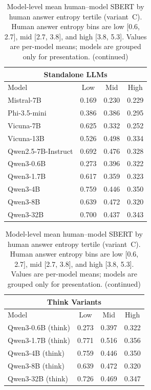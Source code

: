 \begin{table}[t]
\centering
\scriptsize
\caption{Model-level mean human--model SBERT by human answer entropy tertile (variant~C). Human answer entropy bins are low [0.6, 2.7], mid [2.7, 3.8], and high [3.8, 5.3]. Values are per-model means; models are grouped only for presentation. (continued)}
\begin{tabular}{lccc}
\toprule
\multicolumn{4}{c}{\textbf{Standalone LLMs}} \\
\midrule
Model & Low & Mid & High \\
\midrule
Mistral-7B & 0.169 & 0.230 & 0.229 \\
Phi-3.5-mini & 0.386 & 0.386 & 0.295 \\
Vicuna-7B & 0.625 & 0.332 & 0.252 \\
Vicuna-13B & 0.526 & 0.498 & 0.334 \\
Qwen2.5-7B-Instruct & 0.692 & 0.476 & 0.328 \\
Qwen3-0.6B & 0.273 & 0.396 & 0.322 \\
Qwen3-1.7B & 0.617 & 0.359 & 0.323 \\
Qwen3-4B & 0.759 & 0.446 & 0.350 \\
Qwen3-8B & 0.639 & 0.472 & 0.320 \\
Qwen3-32B & 0.700 & 0.437 & 0.343 \\
\bottomrule
\end{tabular}
\end{table}

\begin{table}[t]
\centering
\scriptsize
\caption{Model-level mean human--model SBERT by human answer entropy tertile (variant~C). Human answer entropy bins are low [0.6, 2.7], mid [2.7, 3.8], and high [3.8, 5.3]. Values are per-model means; models are grouped only for presentation. (continued)}
\begin{tabular}{lccc}
\toprule
\multicolumn{4}{c}{\textbf{Think Variants}} \\
\midrule
Model & Low & Mid & High \\
\midrule
Qwen3-0.6B (think) & 0.273 & 0.397 & 0.322 \\
Qwen3-1.7B (think) & 0.771 & 0.516 & 0.356 \\
Qwen3-4B (think) & 0.759 & 0.446 & 0.350 \\
Qwen3-8B (think) & 0.639 & 0.472 & 0.320 \\
Qwen3-32B (think) & 0.726 & 0.469 & 0.347 \\
\bottomrule
\end{tabular}
\end{table}
